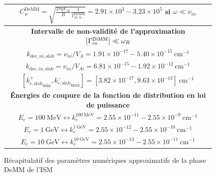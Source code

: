\documentclass[10pt,a4paper]{article}
\begin{document}
\begin{figure}[h]
\begin{tabular}{|c|}
$C^\mathrm{DeMM}_w = \sqrt{\frac{2\pi qV_{Ai}}{B} \frac{1}{\Gamma^\mathrm{DeMM}_{in,w}}} = 2.91\times 10^3 - 3.23 \times 10^5$ si $\omega \ll \nu_{in}$ \\ 
\hline 
\hline
\bf{Intervalle de non-validité de l'approximation $\abs{\Gamma^\mathrm{DiMM}_{in}} \ll \omega_R$} \\ 
\hline
$k_{\mathrm{dec},ni,\mathrm{slab}} = \nu_{ni}/V_A = 1.91\times 10^{-17} - 5.40 \times 10^{-15} ~ \mathrm{cm}^{-1}$ \\ 
$k_{\mathrm{dec},in,\mathrm{slab}} = \nu_{in}/V_{Ai} = 6.81\times 10^{-15} - 1.92 \times 10^{-12} ~ \mathrm{cm}^{-1}$ \\ 
$\left[{k^+_{c,\mathrm{slab}}}_\mathrm{min}, {k^-_{c,\mathrm{slab}}}_\mathrm{max} \right] = [3.82 \times 10^{-17}, 9.63\times 10^{-13}] ~ \mathrm{cm}^{-1}$ \\ 
\hline
\hline
\bf{Énergies de coupure de la fonction de distribution en loi de puissance} \\ 
\hline
$E_c = 100~\mathrm{MeV} \leftrightarrow k^{100~\mathrm{MeV}}_c = 2.55\times 10^{-11} - 2.55 \times 10^{-9}~\mathrm{cm}^{-1}$ \\ 
$E_c = 1~\mathrm{GeV} \leftrightarrow k^{1~\mathrm{GeV}}_c = 2.55\times 10^{-12} - 2.55 \times 10^{-10} ~\mathrm{cm}^{-1}$     \\ 
$E_c = 10~\mathrm{GeV} \leftrightarrow k^{10~\mathrm{GeV}}_c = 2.55\times 10^{-13} - 2.55 \times 10^{-11}~\mathrm{cm}^{-1}$   \\ 
\hline

\end{tabular}
\caption{Récapitulatif des paramètres numériques approximatifs de la phase DeMM de l'ISM} 
\end{figure}
\end{document}
